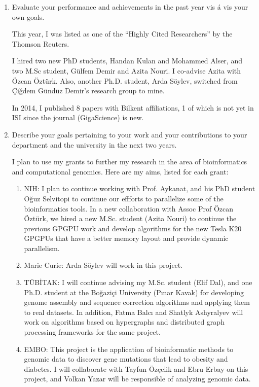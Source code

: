 \begin{enumerate}

\item Evaluate your performance and achievements in the past year vis á vis your own goals. 

This year, I was listed as one of the ``Highly Cited Researchers'' by the Thomson Reuters.

I hired two new PhD students, Handan Kulan and Mohammed Alser, and two M.Sc student, Gülfem Demir and Azita Nouri. I co-advise Azita with Özcan Öztürk.
 Also, another Ph.D. student, Arda Söylev, switched from Çiğdem Gündüz Demir's research group to mine.

In 2014, I published 8 papers with Bilkent affiliations, 1 of which is not yet in ISI since the journal (GigaScience) is new. 
\clearpage
\item Describe your goals pertaining to your work and your contributions to your department and the university in the next two years. 

I plan to use my grants to further my research in the area of bioinformatics and computational genomics. Here are my aims, listed for each grant:

\begin{enumerate}

\item NIH: I plan to continue working with Prof. Aykanat, and his PhD student Oğuz Selvitopi to continue our effforts to parallelize some of the bioinformatics tools. In a new collaboration with Assoc Prof Özcan Öztürk, we hired a new M.Sc. student (Azita Nouri) to continue the previous GPGPU work and develop algorithms for the new Tesla K20 GPGPUs that have a better memory layout and provide dynamic parallelism.
\item Marie Curie: Arda Söylev will work in this project.
\item TÜBİTAK: I will continue advising my  M.Sc. student (Elif Dal), and one Ph.D. student at the Boğaziçi University (Pınar Kavak) for developing genome assembly and sequence correction algorithms and applying them to real datasets. In addition, Fatma Balcı and Shatlyk Ashyralyev will work on algorithms based on hypergraphs and distributed graph processing frameworks for the same project.
\item EMBO: This project is the application of bioinformatic methods to genomic data to discover gene 	  mutations that lead to obesity and diabetes. I will collaborate with Tayfun Özçelik and Ebru Erbay on   	  this project, and Volkan Yazar will be responsible of analyzing genomic data.

\end{enumerate}

\end{enumerate}

